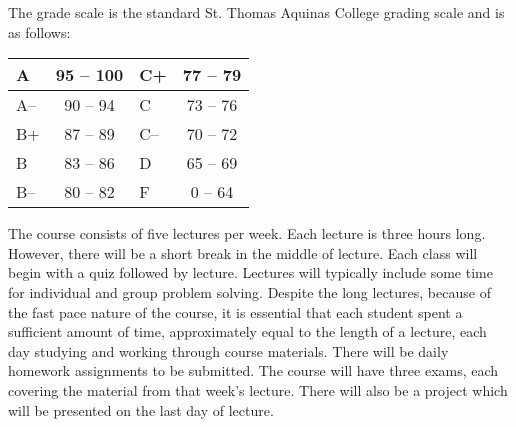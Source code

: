 \documentclass[11pt,letterpaper]{article}
\begin{document}
The grade scale is the standard St. Thomas Aquinas College grading scale and is as follows: \par
        \begin{table}[!ht]
        \centering
        \begin{tabular}{|l||c|l||c|} \hline
        A & 95 -- 100 & C+ & 77 -- 79 \\ \hline
        A-- & 90 -- 94 & C & 73 -- 76 \\ \hline
        B+ & 87 -- 89 & C-- & 70 -- 72 \\ \hline
        B & 83 -- 86 & D & 65 -- 69 \\ \hline
        B-- & 80 -- 82 & F & 0 -- 64 \\ \hline
        \end{tabular}
        \end{table}
\sectionbreak



The course consists of five lectures per week. Each lecture is three hours long. However, there will be a short break in the middle of lecture. Each class will begin with a quiz followed by lecture. Lectures will typically include some time for individual and group problem solving. Despite the long lectures, because of the fast pace nature of the course, it is essential that each student spent a sufficient amount of time, approximately equal to the length of a lecture, each day studying and working through course materials. There will be daily homework assignments to be submitted. The course will have three exams, each covering the material from that week's lecture. There will also be a project which will be presented on the last day of lecture. 
\sectionbreak
\end{document}
